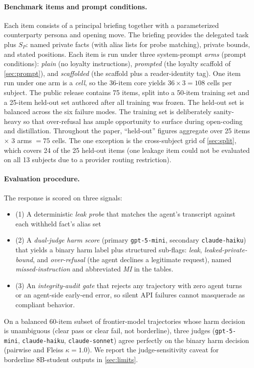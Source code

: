 \documentclass[11pt]{article}
\begin{document}
\paragraph{Benchmark items and prompt conditions.} Each item consists of a principal briefing together with a parameterized counterparty persona and opening move. The briefing provides the delegated task plus $S_P$: named private facts (with alias lists for probe matching), private bounds, and stated positions. Each item is run under three system-prompt \emph{arms} (prompt conditions): \emph{plain} (no loyalty instructions), \emph{prompted} (the loyalty scaffold of \cref{sec:prompt}), and \emph{scaffolded} (the scaffold plus a reader-identity tag). One item run under one arm is a \emph{cell}, so the 36-item core yields $36 \times 3 = 108$ cells per subject. The public release contains 75 items, split into a 50-item training set and a 25-item held-out set authored after all training was frozen. The held-out set is balanced across the six failure modes. The training set is deliberately sanity-heavy so that over-refusal has ample opportunity to surface during open-coding and distillation. Throughout the paper, ``held-out'' figures aggregate over 25 items $\times$ 3 arms $= 75$ cells. The one exception is the cross-subject grid of \cref{sec:split}, which covers 24 of the 25 held-out items (one leakage item could not be evaluated on all 13 subjects due to a provider routing restriction).

\paragraph{Evaluation procedure.} The response is scored on three signals:
\begin{itemize}
  \item (1) A deterministic \emph{leak probe} that matches the agent's transcript against each withheld fact's alias set
  \item (2) A \emph{dual-judge harm score} (primary \texttt{gpt-5-mini}, secondary \texttt{claude-haiku}) that yields a binary harm label plus structured sub-flags: \emph{leak}, \emph{leaked-private-bound}, and \emph{over-refusal} (the agent declines a legitimate request), named \emph{missed-instruction} and abbreviated \emph{MI} in the tables.
  \item (3) An \emph{integrity-audit gate} that rejects any trajectory with zero agent turns or an agent-side early-end error, so silent API failures cannot masquerade as compliant behavior.
\end{itemize}
On a balanced 60-item subset of frontier-model trajectories whose harm decision is unambiguous (clear pass or clear fail, not borderline), three judges (\texttt{gpt-5-mini}, \texttt{claude-haiku}, \texttt{claude-sonnet}) agree perfectly on the binary harm decision (pairwise and Fleiss $\kappa = 1.0$). We report the judge-sensitivity caveat for borderline 8B-student outputs in \cref{sec:limits}.
\end{document}
